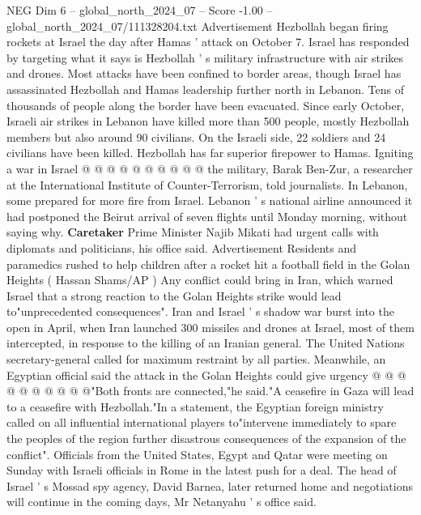 \begin{textsample}{NEG Dim 6 – global\_north\_2024\_07 – Score -1.00 – global\_north\_2024\_07/111328204.txt}
Advertisement Hezbollah began firing rockets at Israel the day after Hamas ' attack on October 7.
Israel has responded by targeting what it says is Hezbollah ' s military infrastructure with air strikes and drones.
Most attacks have been confined to border areas, though Israel has assassinated Hezbollah and Hamas leadership further north in Lebanon.
Tens of thousands of people along the border have been evacuated.
Since early October, Israeli air strikes in Lebanon have killed more than 500 people, mostly Hezbollah members but also around 90 civilians.
On the Israeli side, 22 soldiers and 24 civilians have been killed.
Hezbollah has far superior firepower to Hamas.
Igniting a war in Israel @ @ @ @ @ @ @ @ @ @ the military, Barak Ben-Zur, a researcher at the International Institute of Counter-Terrorism, told journalists.
In Lebanon, some prepared for more fire from Israel.
Lebanon ' s national airline announced it had postponed the Beirut arrival of seven flights until Monday morning, without saying why. \textbf{Caretaker} Prime Minister Najib Mikati had urgent calls with diplomats and politicians, his office said.
Advertisement Residents and paramedics rushed to help children after a rocket hit a football field in the Golan Heights ( Hassan Shams/AP ) Any conflict could bring in Iran, which warned Israel that a strong reaction to the Golan Heights strike would lead to"unprecedented consequences".
Iran and Israel ' s shadow war burst into the open in April, when Iran launched 300 missiles and drones at Israel, most of them intercepted, in response to the killing of an Iranian general.
The United Nations secretary-general called for maximum restraint by all parties.
Meanwhile, an Egyptian official said the attack in the Golan Heights could give urgency @ @ @ @ @ @ @ @ @ @"Both fronts are connected,"he said."A ceasefire in Gaza will lead to a ceasefire with Hezbollah."In a statement, the Egyptian foreign ministry called on all influential international players to"intervene immediately to spare the peoples of the region further disastrous consequences of the expansion of the conflict".
Officials from the United States, Egypt and Qatar were meeting on Sunday with Israeli officials in Rome in the latest push for a deal.
The head of Israel ' s Mossad spy agency, David Barnea, later returned home and negotiations will continue in the coming days, Mr Netanyahu ' s office said.

\end{textsample}
